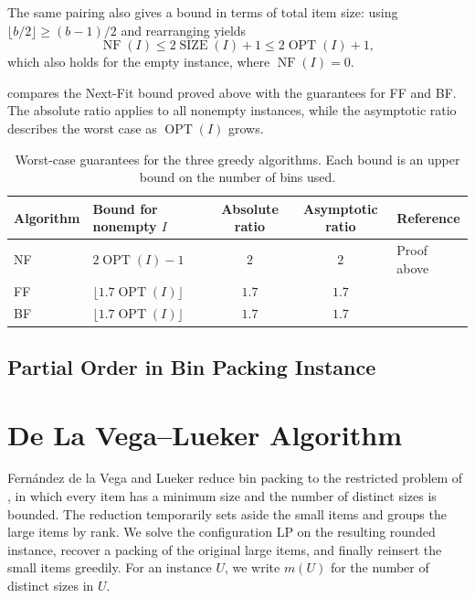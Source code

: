 \documentclass[11pt,a4paper,onecolumn]{article}
\theoremstyle{plain}
\theoremstyle{definition}
\theoremstyle{remark}
\DeclareMathOperator{\OPT}{OPT}
\DeclareMathOperator{\SIZE}{SIZE}
\DeclareMathOperator{\NF}{NF}
\begin{document}
The same pairing also gives a bound in terms of total item size:
using $\lfloor b/2\rfloor\ge(b-1)/2$ and rearranging yields
\begin{equation}
    \label{eq:next-fit-size-bound}
    \NF(I)\le 2\SIZE(I)+1 \leq 2\OPT(I) + 1,
\end{equation}
which also holds for the empty instance, where $\NF(I)=0$.

 compares the Next-Fit bound proved above
with the guarantees for FF and BF. The absolute ratio applies to all nonempty instances,
while the asymptotic ratio describes the worst case as $\OPT(I)$ grows.

\begin{table}[htbp]
    \centering
    \small
    \begin{tabular}{@{}llccl@{}}
        \toprule
        Algorithm & Bound for nonempty $I$ & Absolute ratio & Asymptotic ratio & Reference \\
        \midrule
        NF & $2\OPT(I)-1$ & $2$ & $2$ & Proof above \\
        FF & $\lfloor1.7\OPT(I)\rfloor$ & $1.7$ & $1.7$
            & \cite{sgallOnlineBinPacking2014} \\
        BF & $\lfloor1.7\OPT(I)\rfloor$ & $1.7$ & $1.7$
            & \cite{sgallOnlineBinPacking2014} \\
        \bottomrule
    \end{tabular}
    \caption{Worst-case guarantees for the three greedy algorithms.
        Each bound is an upper bound on the number of bins used.}
    \label{tab:greedy-guarantees}
\end{table}



\subsection{Partial Order in Bin Packing Instance}
\label{subsec:instance-partial-order}


\section{De La Vega--Lueker Algorithm}
\label{sec:dlvl}

Fern\'andez de la Vega and Lueker
\cite{fernandezdelavegaBinPackingCan1981} reduce bin packing to the
restricted problem of , in which every item has
a minimum size and the number of distinct sizes is bounded. The
reduction temporarily sets aside the small items and groups the large
items by rank. We solve the configuration LP on the resulting rounded
instance, recover a packing of the original large items, and finally
reinsert the small items greedily. For an instance $U$, we write $m(U)$
for the number of distinct sizes in $U$.
\end{document}
